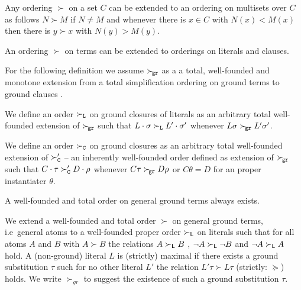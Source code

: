 \begin{lemma}
	Any ordering $\succ$ on a set $C$ can be extended to an ordering on multisets over $C$
	as follows $N \succ M$ if $N \neq M$
	and whenever there is $x\in C$ with $N(x) < M(x)$
	then there is $y \succ x$ with $N(y) > M(y)$.

	An ordering $\succ$ on terms can be extended to orderings on literals and clauses.
\end{lemma}
For the following definition we assume
$\mathrel\succ_{\!\mathtt{gr}}$ as a a total, well-founded and monotone extension
from a total simplification ordering on ground terms
to ground clauses \cite{NR2001}.

\begin{definition}
    We define an order $\mathrel\succ_{\mathtt{L}}$ on ground closures of literals
    as an arbitrary total well-founded extension of $\mathrel\succ_{\!\mathtt{gr}}$
    such that
    $L\cdot\sigma\mathrel\succ_{\mathtt{L}} L'\cdot\sigma'$ whenever
    $L\sigma\mathrel\succ_{\!\mathtt{gr}} L'\sigma'$.

    We define an order \( \mathrel\succ_{\mathtt{C}} \) on ground closures
    as an arbitrary total well-founded extension of
    $\mathrel\succ_{\mathtt{C}}'$ -- an inherently well-founded order defined as extension of $\mathrel\succ_{\!\mathtt{gr}}$
    such that
    $C\cdot\tau\mathrel\succ_{\mathtt{C}}' D\cdot\rho$ whenever
    $C\tau\mathrel\succ_{\!\mathtt{gr}} D\rho$ or $C\theta = D$ for an proper instantiater $\theta$.
\end{definition}

\begin{lemma}A well-founded and total order on general ground terms always exists.\end{lemma}

	\begin{definition}\label{def:orders-on-literals}
		We extend a well-founded and total order $\succ$ on general ground terms,
		i.e~general atoms to a well-founded proper order $\succ_{\mathsf{L}}$
		on literals such that for all atoms $A$ and $B$ with $A\succ B$
		the relations $A\succ_{\mathsf{L}} B$ ,
		$\lnot A\succ_{\mathsf{L}}\lnot B$ and
		$\lnot A\succ_{\mathsf{L}} A$ hold.
		A (non-ground) literal $L$ is {\myem (strictly) maximal} if there exists a ground substitution $\tau$
		such for no other literal $L'$ the relation $L'\tau\succ L\tau$ (strictly: $\succcurlyeq$) holds.
		We write $\succ_{gr}$ to suggest the existence of such a ground substitution $\tau$.
	\end{definition}




